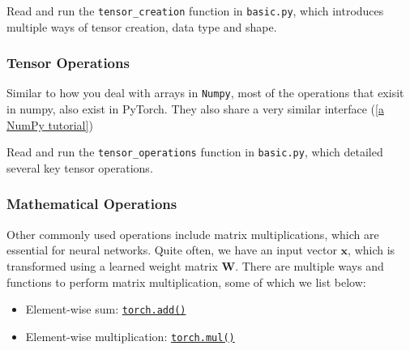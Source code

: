 \noindent Read and run the \texttt{tensor\_creation} function in \texttt{basic.py}, which introduces multiple ways of tensor creation, data type and shape.

\subsubsection{Tensor Operations}
\noindent Similar to how you deal with arrays in \texttt{Numpy}, most of the operations that exisit in numpy, also exist in PyTorch. They also share a very similar interface (\href{https://numpy.org/devdocs/user/quickstart.html}{[a NumPy tutorial]})

\noindent Read and run the \texttt{tensor\_operations} function in \texttt{basic.py}, which detailed several key tensor operations.

\subsubsection{Mathematical Operations}
\noindent Other commonly used operations include matrix multiplications, which are essential for neural networks. Quite often, we have an input vector $\mathbf{x}$, which is transformed using a learned weight matrix $\mathbf{W}$. There are multiple ways and functions to perform matrix multiplication, some of which we list below:

\begin{itemize}
    \item Element-wise sum: \href{https://pytorch.org/docs/stable/generated/torch.add.html}{\texttt{torch.add()}}
    \item Element-wise multiplication: \href{https://pytorch.org/docs/stable/generated/torch.mul.html}{\texttt{torch.mul()}}
\end{itemize}

